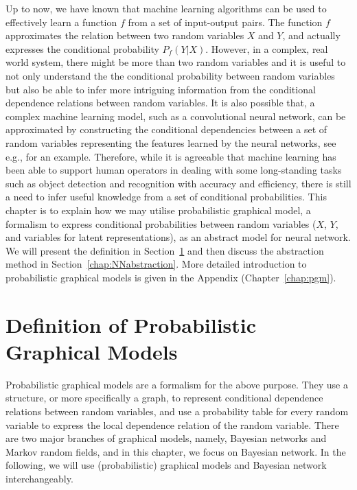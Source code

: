 
Up to now, we have known that machine learning algorithms can be used to effectively learn a function $f$ from a set of input-output pairs. The function $f$ approximates the relation between two random variables $X$ and $Y$, and actually expresses the conditional probability $P_f(Y|X)$. However, in a complex, real world system, there might be more than two random variables and it is useful to not only understand the the conditional probability between random variables but also be able to infer more intriguing information from the conditional dependence relations between random variables.
It is also possible that, a complex machine learning model, such as a convolutional neural network, can be approximated by constructing the conditional dependencies between a set of random variables representing the features learned by the neural networks, see e.g., \cite{berthier2021abstraction} for an example.  Therefore, while it is agreeable that machine learning has been able to support human operators in dealing with some long-standing tasks such as object detection and recognition with accuracy and efficiency, there is still a need to infer useful knowledge from a set of conditional probabilities. 
This chapter is to explain how we may utilise probabilistic graphical model, a formalism to express conditional probabilities between random variables ($X$, $Y$, and variables for latent representations), as an abstract model for neural network. We will present the definition in Section~\ref{sec:defPGM} and then discuss the abstraction method in Section~\ref{chap:NNabstraction}. More detailed introduction to probabilistic graphical models is given in the Appendix (Chapter~\ref{chap:pgm}). 

\section{Definition of Probabilistic Graphical Models}\label{sec:defPGM}

Probabilistic graphical models are a formalism for the above purpose. They use a structure, or more specifically a graph, to represent conditional dependence relations between random variables, and use a probability table for every random variable to express the local dependence relation of the random variable. There are two major branches of graphical models, namely, Bayesian networks and Markov random fields, and in this chapter, we focus on Bayesian network. In the following, we will use (probabilistic) graphical models and Bayesian network interchangeably. 


